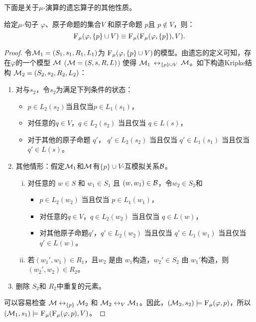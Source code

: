 


下面是关于$\mu$-演算的遗忘算子的其他性质。


\begin{proposition}[Modularity]\label{chapter06:disTF}  给定$\mu$-句子 $\varphi$、原子命题的集合$V$ 和原子命题 $p$且 $p \notin V$，则：
	\[
	{\textsc{F}_{\textsc{$\mu$}}}(\varphi, \{p\} \cup V) \equiv {\textsc{F}_{\textsc{$\mu$}}}({\textsc{F}_{\textsc{$\mu$}}}(\varphi, \{p\}), V).
	\]
\end{proposition}
\begin{proof}
	令${\cal M}_1=(S_1, s_1, R_1, L_1)$为 ${\textsc{F}_{\textsc{$\mu$}}}(\varphi, \{p\} \cup V)$的模型。由遗忘的定义可知，存在$\varphi$的一个模型 ${\cal M}$ (${\cal M} = (S, s, R,L)$) 使得 ${\cal M}_1$ $\leftrightarrow_{\{p\} \cup V}$ ${\cal M}$。如下构造Kripke结构 ${\cal M}_2 = (S_2, s_2, R_2, L_2)$：
	\begin{enumerate}[(1)]
		\item 对与$s_2$，令$s_2$为满足下列条件的状态：
		\begin{itemize}
			\item $p \in L_2(s_2)$当且仅当$p \in L_1(s_1)$，
			\item 对任意的$q \in V$，$q \in L_2(s_2)$ 当且仅当 $q\in L(s)$，
			\item 对于其他的原子命题 $q'$， $q' \in L_2(s_2)$ 当且仅当 $q' \in L_1(s_1)$ 当且仅当 $q'\in L(s)$。
		\end{itemize}
		\item 其他情形：假定${\cal M}_1$和${\cal M}$有$\{p\} \cup V$-互模拟关系${\cal B}$。
		\begin{enumerate}[(i)]
			\item 对任意的 $w \in S$ 和 $w_1 \in S_1$ 且 $(w,w_1)\in {\cal B}$，令$w_2 \in S_2$和
			\begin{itemize}
				\item $p \in L_2(w_2)$ 当且仅当 $p \in L_1(w_1)$，
				\item 对任意的$q \in V$，$q \in L_2(w_2)$ 当且仅当 $q\in L(w)$，
				\item 对其他原子命题$q'$，$q' \in L_2(w_2)$ 当且仅当 $q' \in L_1(w_1)$ 当且仅当 $q'\in L(w)$。
			\end{itemize}
			\item 若$(w_1', w_1)\in R_1$，且$w_2$ 是由 $w_1$构造，$w_2'\in S_2$ 由 $w_1'$构造，则$(w_2', w_2)\in R_2$。
		\end{enumerate}
		\item 删除 $S_2$和 $R_2$中重复的元素。
	\end{enumerate}
	可以容易检查 ${\cal M} \leftrightarrow_{\{p\}} {\cal M}_2$ 和 ${\cal M}_2 \leftrightarrow_V {\cal M}_1$。因此，$({\cal M}_2, s_2) \models {\textsc{F}_{\textsc{$\mu$}}}(\varphi, p)$，所以 $({\cal M}_1, s_1) \models {\textsc{F}_{\textsc{$\mu$}}}({\textsc{F}_{\textsc{$\mu$}}}(\varphi, p), V)$。
	

\end{proof}
